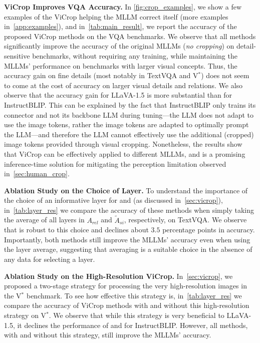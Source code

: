 \textbf{ViCrop Improves VQA Accuracy.} In \cref{fig:crop_examples}, we show a few examples of the ViCrop helping the MLLM correct itself (more examples in~\cref{app:examples}), and in~\cref{tab:main_result}, we report the accuracy of the proposed ViCrop methods on the VQA benchmarks. We observe that all methods significantly improve the accuracy of the original MLLMs (\emph{no cropping}) on detail-sensitive benchmarks, without requiring any training, while maintaining the MLLMs' performance on benchmarks with larger visual concepts. Thus, the accuracy gain on fine details (most notably in TextVQA and V$^*$) does not seem to come at the cost of accuracy on larger visual details and relations. We also observe that the accuracy gain for LLaVA-1.5 is more substantial than for InstructBLIP. This can be explained by the fact that InstructBLIP only trains its connector and not its backbone LLM during tuning---the LLM does not adapt to use the image tokens, rather the image tokens are adapted to optimally prompt the LLM---and therefore the LLM cannot effectively use the additional (cropped) image tokens provided through visual cropping. Nonetheless, the results show that ViCrop can be effectively applied to different MLLMs, and is a promising inference-time solution for mitigating the perception limitation observed in~\cref{sec:human_crop}.



\textbf{Ablation Study on the Choice of Layer.}
To understand the importance of the choice of an informative layer for \rel{} and \gra{} (as discussed in~\cref{sec:vicrop}), in~\cref{tab:layer_res} we compare the accuracy of these methods when simply taking the average of all layers in ${A_{rel}}$ and $\tilde{A}_{si}$, respectively, on TextVQA. We observe that \rel{} is robust to this choice and \gra{} declines about $3.5$ percentage points in accuracy. Importantly, both methods still improve the MLLMs' accuracy even when using the layer average, suggesting that averaging is a suitable choice in the absence of any data for selecting a layer.

\textbf{Ablation Study on the High-Resolution ViCrop.} In~\cref{sec:vicrop}, we proposed a two-stage strategy for processing the very high-resolution images in the V$^*$ benchmark. To see how effective this strategy is, in~\cref{tab:layer_res} we compare the accuracy of ViCrop methods with and without this high-resolution strategy on V$^*$. We observe that while this strategy is very beneficial to LLaVA-1.5, it declines the performance of \gra{} and \pgra{} for InstructBLIP. However, all methods, with and without this strategy, still improve the MLLMs' accuracy.

